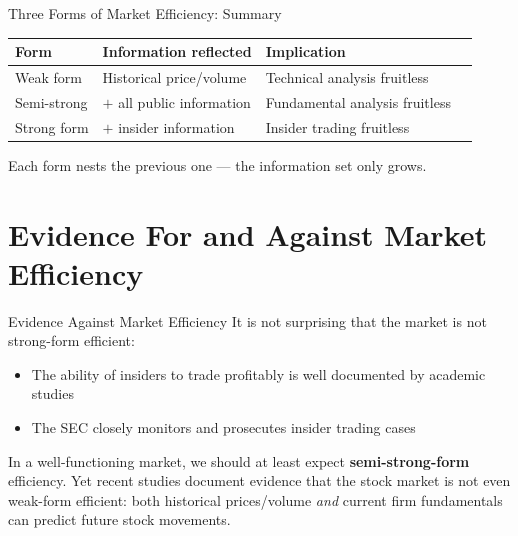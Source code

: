 \documentclass[aspectratio=169]{beamer}
\begin{document}
\begin{frame}{Three Forms of Market Efficiency: Summary}
\begin{table}
\centering
\small
\begin{tabular}{llll}
\toprule
\textbf{Form} & \textbf{Information reflected} & \textbf{Implication} & \\
\midrule
Weak form & Historical price/volume & Technical analysis fruitless & \\
Semi-strong & $+$ all public information & Fundamental analysis fruitless & \\
Strong form & $+$ insider information & Insider trading fruitless & \\
\bottomrule
\end{tabular}
\end{table}
\vspace{0.3em}
Each form nests the previous one --- the information set only grows.
\end{frame}


\section{Evidence For and Against Market Efficiency}

\begin{frame}{Evidence Against Market Efficiency}
It is not surprising that the market is not strong-form efficient:
\begin{itemize}
  \item The ability of insiders to trade profitably is well documented by academic studies
  \item The SEC closely monitors and prosecutes insider trading cases
\end{itemize}
\vspace{0.3em}
In a well-functioning market, we should at least expect \textbf{semi-strong-form} efficiency. Yet recent studies document evidence that the stock market is not even weak-form efficient: both historical prices/volume \emph{and} current firm fundamentals can predict future stock movements.
\end{frame}
\end{document}
